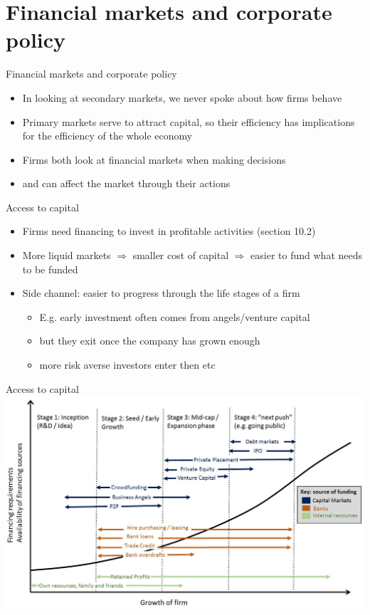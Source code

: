\documentclass[english,10pt
,aspectratio=169
]{beamer}
\begin{document}
\section{Financial markets and corporate policy}


\begin{frame}{Financial markets and corporate policy}
	\begin{itemize}
		\item In looking at secondary markets, we never spoke about how firms behave
		\item Primary markets serve to attract capital, so their efficiency has implications for the efficiency of the whole economy
		\item Firms both look at financial markets when making decisions
		\item and can affect the market through their actions
	\end{itemize}
\end{frame}


\begin{frame}{Access to capital}
	\begin{itemize}
		\item Firms need financing to invest in profitable activities (section 10.2)
		\item More liquid markets $\Rightarrow$ smaller cost of capital $\Rightarrow$ easier to fund what needs to be funded
		\item Side channel: easier to progress through the life stages of a firm
		\begin{itemize}
			\item E.g. early investment often comes from angels/venture capital
			\item but they exit once the company has grown enough
			\item more risk averse investors enter then etc
		\end{itemize}
	\end{itemize}
\end{frame}


\begin{frame}{Access to capital}
	\centering
	\includegraphics[width=.7\paperwidth]{pics/funding}
\end{frame}
\end{document}
